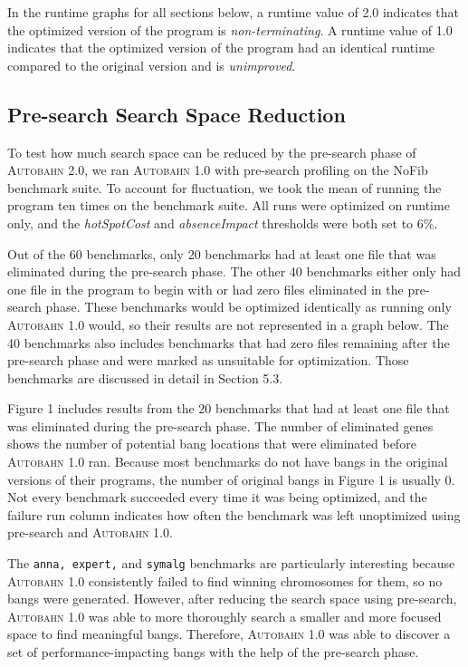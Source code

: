 \documentclass[format=sigplan, review=true]{acmart}
\newcommand{\hotspotcost}[0]{\textit{hotSpotCost}}
\newcommand{\Ao}[0]{\textsc{Autobahn 1.0}}
\newcommand{\At}[0]{\textsc{Autobahn 2.0}}
\newcommand{\preopt}[0]{pre-search}
\newcommand{\Preopt}[0]{Pre-search}
\newcommand{\absim}[0]{\textit{absenceImpact}}
\newcommand{\nonterm}[0]{non-terminating}
\newcommand{\unimp}[0]{unimproved}
\begin{document}
In the runtime graphs for all sections below, a runtime value of 2.0 indicates that the optimized version of the program is \textit{\nonterm{}}. A runtime value of 1.0 indicates that the optimized version of the program had an identical runtime compared to the original version and is \textit{\unimp{}}.


\subsection{\Preopt{} Search Space Reduction}
To test how much search space can be reduced by the \preopt{} phase of \At{}, we ran \Ao{} with \preopt{} profiling on the NoFib benchmark suite. To account for fluctuation, we took the mean of running the program ten times on the benchmark suite. All runs were optimized on runtime only, and the \hotspotcost{} and \absim{} thresholds were both set to 6\%. 

Out of the 60 benchmarks, only 20 benchmarks had at least one file that was eliminated during the \preopt{} phase. The other 40 benchmarks either only had one file in the program to begin with or had zero files eliminated in the \preopt{} phase. These benchmarks would be optimized identically as running only \Ao{} would, so their results are not represented in a graph below. The 40 benchmarks also includes benchmarks that had zero files remaining after the \preopt{} phase and were marked as unsuitable for optimization. Those benchmarks are discussed in detail in Section 5.3.

Figure 1 includes results from the 20 benchmarks that had at least one file that was eliminated during the \preopt{} phase. The number of eliminated genes shows the number of potential bang locations that were eliminated before \Ao{} ran. Because most benchmarks do not have bangs in the original versions of their programs, the number of original bangs in Figure 1 is usually 0. Not every benchmark succeeded every time it was being optimized, and the failure run column indicates how often the benchmark was left unoptimized using \preopt{} and \Ao{}.

The \texttt{anna, expert,} and \texttt{symalg} benchmarks are particularly interesting because \Ao{} consistently failed to find winning chromosomes for them, so no bangs were generated. However, after reducing the search space using \preopt{}, \Ao{} was able to more thoroughly search a smaller and more focused space to find meaningful bangs. Therefore, \Ao{} was able to discover a set of performance-impacting bangs with the help of the \preopt{} phase. 
\end{document}
